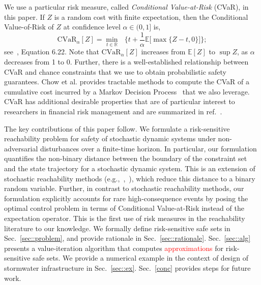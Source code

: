 \documentclass[letterpaper, 10 pt, conference]{ieeeconf}  %
\begin{document}
We use a particular risk measure, called \textit{Conditional Value-at-Risk} (CVaR), in this paper.
If $Z$ is a random cost with finite expectation, then the Conditional Value-of-Risk of $Z$ at confidence level $\alpha \in (0,1]$
is, 
\begin{equation}
\text{CVaR}_\alpha[Z] = {\underset{t \in \mathbb{R}}\min} \text{ }\Big\{ t + \frac{1}{\alpha}\mathbb{E}\big[\max\{Z-t,0\}\big] \Big\};
\label{cvareqn}
\end{equation}
see~\cite{shapiro2009lectures}, Equation 6.22.\footnotemark
{}
Note that $\text{CVaR}_\alpha[Z]$ increases from $\mathbb{E}[Z]$ to $\sup Z$, as $\alpha$ decreases from 1 to 0.\footnotemark
{}
Further, there is a well-established relationship between CVaR and chance constraints
that we use to obtain probabilistic safety guarantees. 
Chow et al. provides tractable methods to compute the CVaR of a cumulative cost
incurred by a Markov Decision Process~\cite{chow2015risk} that we also leverage.
CVaR has additional desirable properties that are of particular interest to researchers in financial risk management and are summarized in ref.~\cite{serraino2013conditional}. 

The key contributions of this paper follow.
We formulate a risk-sensitive reachability problem for safety of stochastic dynamic systems under non-adversarial disturbances
over a finite-time horizon. In particular, our formulation quantifies the non-binary distance between the boundary of the constraint set and the
state trajectory for a stochastic dynamic system. This is an extension of stochastic 
reachability methods (e.g.,~\cite{abate2008probabilistic},~\cite{summers2010verification}), which reduce this distance to a binary random variable.
Further, in contrast to stochastic reachability methods, our formulation explicitly accounts for rare high-consequence events by posing the optimal control problem
in terms of Conditional Value-at-Risk instead of the expectation operator. This is the first use of risk measures in the reachability literature to our knowledge.
We formally define risk-sensitive safe sets in Sec.~\ref{sec::problem}, and provide rationale in Sec.~\ref{sec::rationale}.
Sec.~\ref{sec::alg} presents a value-iteration algorithm that computes \textcolor{red}{approximations} for risk-sensitive safe sets. %
We provide a numerical example in the context of design of stormwater infrastructure in Sec.~\ref{sec::ex}. Sec.~\ref{conc} provides steps for future work.
\end{document}
